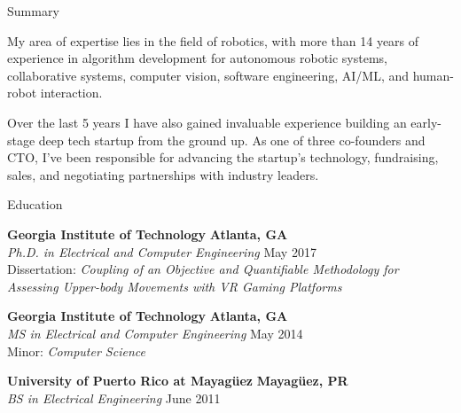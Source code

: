 \documentclass{resume} %
\newcommand{\sectionspace}{\vspace{3mm}}
\begin{document}
\begin{rSection}{Summary}

  My area of expertise lies in the field of robotics, with more than 14 years
  of experience in algorithm development for autonomous robotic systems,
  collaborative systems, computer vision, software engineering, AI/ML, and
  human-robot interaction.

  Over the last 5 years I have also gained invaluable experience building an
  early-stage deep tech startup from the ground up. As one of three co-founders
  and CTO, I've been responsible for advancing the startup's technology,
  fundraising, sales, and negotiating partnerships with industry leaders.


\end{rSection}




\sectionspace
\begin{rSection}{Education}

{\bf Georgia Institute of Technology} \hfill {\bf Atlanta, GA} \\
\textit{Ph.D. in Electrical and Computer Engineering} \hfill May 2017 \\
Dissertation: \textit{Coupling of an Objective and Quantifiable Methodology for Assessing Upper-body Movements with VR Gaming Platforms}

{\bf Georgia Institute of Technology} \hfill {\bf Atlanta, GA} \\
\textit{MS in Electrical and Computer Engineering} \hfill May 2014 \\
Minor: \textit{Computer Science}

{\bf University of Puerto Rico at Mayag\"{u}ez} \hfill {\bf Mayag\"{u}ez, PR} \\
\textit{BS in Electrical Engineering} \hfill June 2011

\end{rSection}
\end{document}
